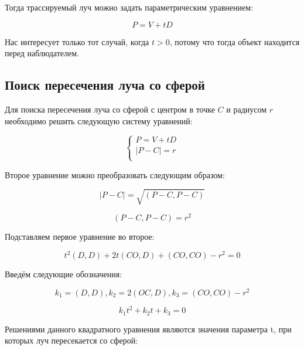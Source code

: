 Тогда трассируемый луч можно задать параметрическим уравнением:

\begin{equation}
P = V + tD
\end{equation}

Нас интересует только тот случай, когда $t > 0$, потому что тогда объект находится перед наблюдателем.

\subsection{Поиск пересечения луча со сферой}

Для поиска пересечения луча со сферой с центром в точке $C$ и радиусом $r$ необходимо решить следующую систему уравнений:

\begin{equation}
	\label{eq:sphere_intersect}
	\begin{cases}
		P = V + tD\\
		|P - C| = r\\
	\end{cases}
\end{equation}

Второе уравнение можно преобразовать следующим образом:

\begin{equation}
|P - C| = \sqrt{(P - C, P - C)}
\end{equation}

\begin{equation}
(P - C, P - C) = r^2
\end{equation}

Подставляем первое уравнение во второе:

\begin{equation}
t^2(D, D) + 2t(CO, D) + (CO, CO) - r^2 = 0
\end{equation}

 Введём следующие обозначения:

\begin{equation}
k_1 = (D, D),   k_2 = 2(OC, D),   k_3 = (CO, CO) - r^2
\end{equation}

\begin{equation}
k_1t^2 + k_2t + k_3 = 0
\end{equation}

Решениями данного квадратного уравнения являются значения параметра t, при которых луч пересекается со сферой:

